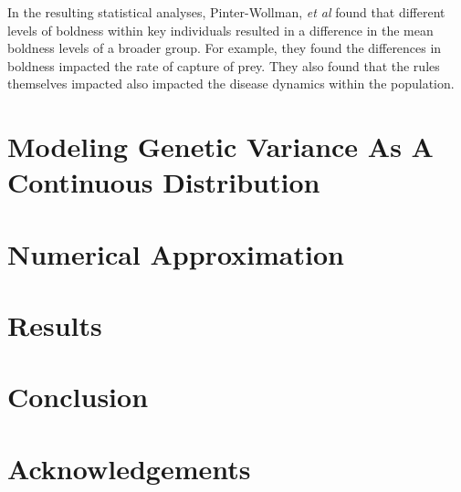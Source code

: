 \documentclass[12pt]{article}
\begin{document}
In the resulting statistical analyses, Pinter-Wollman, \textit{et al}
found that different levels of boldness within key individuals
resulted in a difference in the mean boldness levels of a broader
group. For example, they found the differences in boldness impacted
the rate of capture of prey. They also found that the rules themselves
impacted also impacted the disease dynamics within the population.


\section{Modeling Genetic Variance As A Continuous Distribution}

\section{Numerical Approximation}

\section{Results}

\section{Conclusion}

\section{Acknowledgements}
\end{document}
